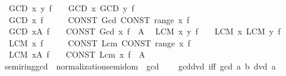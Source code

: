 \begin{isabellebody}
\isanewline
{}\isamarkupfalse%
\isanewline
\ \ {\isachardoublequoteopen}GCD\ x\ y{\isachardot}{\kern0pt}\ f{\isachardoublequoteclose}\ \ \ {\isasymrightleftharpoons}\ {\isachardoublequoteopen}GCD\ x{\isachardot}{\kern0pt}\ GCD\ y{\isachardot}{\kern0pt}\ f{\isachardoublequoteclose}\isanewline
\ \ {\isachardoublequoteopen}GCD\ x{\isachardot}{\kern0pt}\ f{\isachardoublequoteclose}\ \ \ \ \ {\isasymrightleftharpoons}\ {\isachardoublequoteopen}CONST\ Gcd\ {\isacharparenleft}{\kern0pt}CONST\ range\ {\isacharparenleft}{\kern0pt}{\isasymlambda}x{\isachardot}{\kern0pt}\ f{\isacharparenright}{\kern0pt}{\isacharparenright}{\kern0pt}{\isachardoublequoteclose}\isanewline
\ \ {\isachardoublequoteopen}GCD\ x{\isasymin}A{\isachardot}{\kern0pt}\ f{\isachardoublequoteclose}\ \ \ {\isasymrightleftharpoons}\ {\isachardoublequoteopen}CONST\ Gcd\ {\isacharparenleft}{\kern0pt}{\isacharparenleft}{\kern0pt}{\isasymlambda}x{\isachardot}{\kern0pt}\ f{\isacharparenright}{\kern0pt}\ {\isacharbackquote}{\kern0pt}\ A{\isacharparenright}{\kern0pt}{\isachardoublequoteclose}\isanewline
\ \ {\isachardoublequoteopen}LCM\ x\ y{\isachardot}{\kern0pt}\ f{\isachardoublequoteclose}\ \ \ {\isasymrightleftharpoons}\ {\isachardoublequoteopen}LCM\ x{\isachardot}{\kern0pt}\ LCM\ y{\isachardot}{\kern0pt}\ f{\isachardoublequoteclose}\isanewline
\ \ {\isachardoublequoteopen}LCM\ x{\isachardot}{\kern0pt}\ f{\isachardoublequoteclose}\ \ \ \ \ {\isasymrightleftharpoons}\ {\isachardoublequoteopen}CONST\ Lcm\ {\isacharparenleft}{\kern0pt}CONST\ range\ {\isacharparenleft}{\kern0pt}{\isasymlambda}x{\isachardot}{\kern0pt}\ f{\isacharparenright}{\kern0pt}{\isacharparenright}{\kern0pt}{\isachardoublequoteclose}\isanewline
\ \ {\isachardoublequoteopen}LCM\ x{\isasymin}A{\isachardot}{\kern0pt}\ f{\isachardoublequoteclose}\ \ \ {\isasymrightleftharpoons}\ {\isachardoublequoteopen}CONST\ Lcm\ {\isacharparenleft}{\kern0pt}{\isacharparenleft}{\kern0pt}{\isasymlambda}x{\isachardot}{\kern0pt}\ f{\isacharparenright}{\kern0pt}\ {\isacharbackquote}{\kern0pt}\ A{\isacharparenright}{\kern0pt}{\isachardoublequoteclose}\isanewline
\isanewline
{}\isamarkupfalse%
\ semiring{\isacharunderscore}{\kern0pt}gcd\ {\isacharequal}{\kern0pt}\ normalization{\isacharunderscore}{\kern0pt}semidom\ {\isacharplus}{\kern0pt}\ gcd\ {\isacharplus}{\kern0pt}\isanewline
\ \ \ gcd{\isacharunderscore}{\kern0pt}dvd{}\ {\isacharbrackleft}{\kern0pt}iff{\isacharbrackright}{\kern0pt}{\isacharcolon}{\kern0pt}\ {\isachardoublequoteopen}gcd\ a\ b\ dvd\ a{\isachardoublequoteclose}\isanewline

\end{isabellebody}
